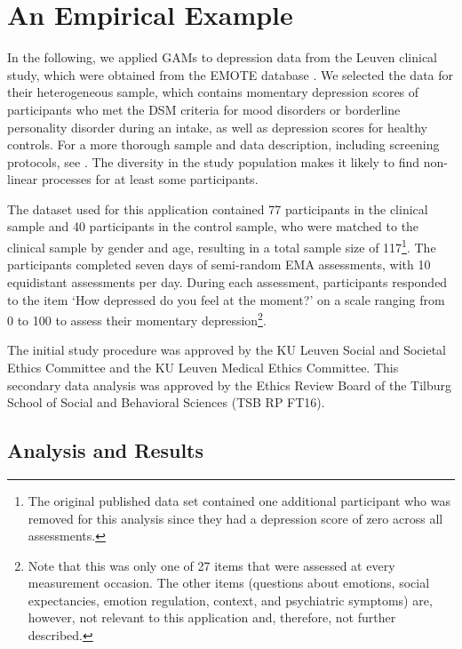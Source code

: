 \documentclass[man, floatsintext]{apa7}
\begin{document}
\section{An Empirical Example} \label{empirical_example}

In the following, we applied GAMs to depression data from the Leuven clinical
study, which were obtained from the EMOTE database
\parencite{kalokerinos_emote_nodate}. We selected the data for their
heterogeneous sample, which contains momentary depression scores of
participants who met the DSM criteria for mood disorders or borderline
personality disorder during an intake, as well as depression scores for healthy
controls. For a more thorough sample and data description, including screening
protocols, see \textcite{heininga_dynamical_2019}. The diversity in the study
population makes it likely to find non-linear processes for at least some
participants.

The dataset used for this application contained 77 participants in the clinical
sample and 40 participants in the control sample, who were matched to the
clinical sample by gender and age, resulting in a total sample size of
117\footnote{The original published data set contained one additional
  participant who was removed for this analysis since they had a depression
  score
  of zero across all assessments.}. The participants completed seven days of
semi-random EMA assessments, with 10 equidistant assessments per day. During
each assessment, participants responded to the item `How depressed do you feel
at the moment?' on a scale ranging from 0 to 100 to assess their momentary
depression\footnote{Note that this was only one of 27 items that were assessed
  at every measurement occasion. The other items (questions about emotions,
  social expectancies, emotion regulation, context, and psychiatric symptoms)
  are, however, not relevant to this application and, therefore, not further
  described.}.

The initial study procedure was approved by the KU Leuven Social and Societal
Ethics Committee and the KU Leuven Medical Ethics Committee. This secondary
data analysis was approved by the Ethics Review Board of the Tilburg School
of Social and Behavioral Sciences (TSB RP FT16).

\subsection{Analysis and Results}
\end{document}
